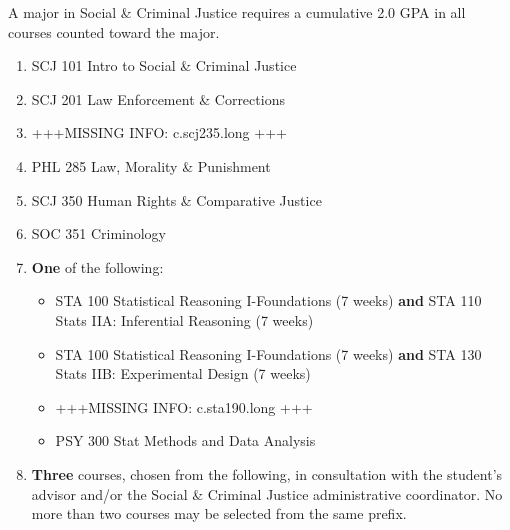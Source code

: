 \documentclass[
  letterpaper,
]{scrbook}
\providecommand{\tightlist}{%
  \setlength{\itemsep}{0pt}\setlength{\parskip}{0pt}}
\begin{document}
A major in Social \& Criminal Justice requires a cumulative 2.0 GPA in
all courses counted toward the major.

\begin{enumerate}
\def\labelenumi{\arabic{enumi}.}
\item
  SCJ 101 Intro to Social \& Criminal Justice
\item
  SCJ 201 Law Enforcement \& Corrections
\item
  +++MISSING INFO: c.scj235.long +++
\item
  PHL 285 Law, Morality \& Punishment
\item
  SCJ 350 Human Rights \& Comparative Justice
\item
  SOC 351 Criminology
\item
  \textbf{One} of the following:

  \begin{itemize}
  \tightlist
  \item
    STA 100 Statistical Reasoning I-Foundations (7 weeks) \textbf{and}
    STA 110 Stats IIA: Inferential Reasoning (7 weeks)
  \item
    STA 100 Statistical Reasoning I-Foundations (7 weeks) \textbf{and}
    STA 130 Stats IIB: Experimental Design (7 weeks)
  \item
    +++MISSING INFO: c.sta190.long +++
  \item
    PSY 300 Stat Methods and Data Analysis
  \end{itemize}
\item
  \textbf{Three} courses, chosen from the following, in consultation
  with the student's advisor and/or the Social \& Criminal Justice
  administrative coordinator. No more than two courses may be selected
  from the same prefix.


\end{enumerate}
\end{document}
